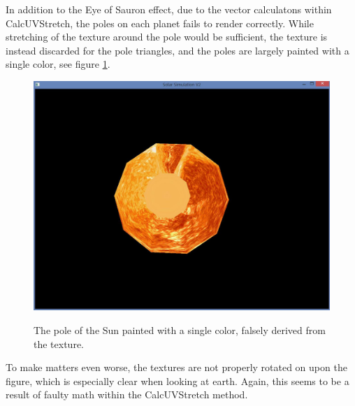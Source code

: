 In addition to the Eye of Sauron effect, due to the vector calculatons within CalcUVStretch, the poles on each planet fails to render correctly. While stretching of the texture around the pole would be sufficient, the texture is instead discarded for the pole triangles, and the poles are largely painted with a single color, see figure \ref{PolarError}.\\
\begin{figure}
	\centering
	\includegraphics[scale=0.3]{Pictures/Bugs/PolarTextureError}
	\label{PolarError}
	\caption{The pole of the Sun painted with a single color, falsely derived from the texture.}
\end{figure}
To make matters even worse, the textures are not properly rotated on upon the figure, which is especially clear when looking at earth. Again, this seems to be a result of faulty math within the CalcUVStretch method.

